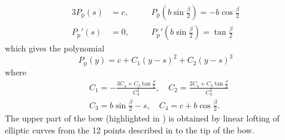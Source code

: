 \begin{alignat*}{3}
	P_{\mathrm{p}}(s) &= c,\quad  &&P_{\mathrm{p}}\left(b\sin\frac{\beta}{2}\right) = -b\cos\frac{\beta}{2}\\
	P_{\mathrm{p}}'(s) &= 0,\quad &&P_{\mathrm{p}}'\left(b\sin\frac{\beta}{2}\right) = \tan\frac{\beta}{2}
\end{alignat*}
which gives the polynomial
\begin{equation*}
	P_{\mathrm{p}}(y) = c+C_1(y-s)^2+C_2(y-s)^3
\end{equation*}
where
\begin{equation*}
\begin{aligned}
	&C_1 = -\frac{3C_4+C_3\tan\frac{\beta}{2}}{C_3^2}, \quad
	C_2 = \frac{2C_4+C_3\tan\frac{\beta}{2}}{C_3^3}\\
	&C_3 = b\sin\frac{\beta}{2}-s, \quad
	C_4 = c+b\cos\frac{\beta}{2}.
\end{aligned}
\end{equation*}
The upper part of the bow (highlighted in ) is obtained by linear lofting of elliptic curves from the 12 points described in  to the tip of the bow. 

